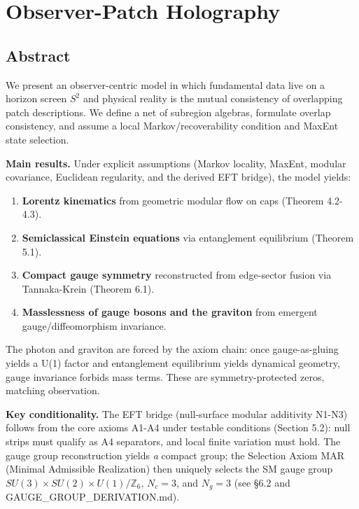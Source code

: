 \documentclass[
]{article}
\author{}
\date{}
\providecommand{\tightlist}{%
  \setlength{\itemsep}{0pt}\setlength{\parskip}{0pt}}
\begin{document}
\section{Observer-Patch Holography}\label{observer-patch-holography}

\subsection{Abstract}\label{abstract}

We present an observer-centric model in which fundamental data live on a
horizon screen \(S^2\) and physical reality is the mutual consistency of
overlapping patch descriptions. We define a net of subregion algebras,
formulate overlap consistency, and assume a local Markov/recoverability
condition and MaxEnt state selection.

\textbf{Main results.} Under explicit assumptions (Markov locality,
MaxEnt, modular covariance, Euclidean regularity, and the derived EFT
bridge), the model yields:

\begin{enumerate}
\def\labelenumi{\arabic{enumi}.}
\tightlist
\item
  \textbf{Lorentz kinematics} from geometric modular flow on caps
  (Theorem 4.2-4.3).
\item
  \textbf{Semiclassical Einstein equations} via entanglement equilibrium
  (Theorem 5.1).
\item
  \textbf{Compact gauge symmetry} reconstructed from edge-sector fusion
  via Tannaka-Krein (Theorem 6.1).
\item
  \textbf{Masslessness of gauge bosons and the graviton} from emergent
  gauge/diffeomorphism invariance.
\end{enumerate}

The photon and graviton are forced by the axiom chain: once
gauge-as-gluing yields a U(1) factor and entanglement equilibrium yields
dynamical geometry, gauge invariance forbids mass terms. These are
symmetry-protected zeros, matching observation.

\textbf{Key conditionality.} The EFT bridge (null-surface modular
additivity N1-N3) follows from the core axioms A1-A4 under testable
conditions (Section 5.2): null strips must qualify as A4 separators, and
local finite variation must hold. The gauge group reconstruction yields
\emph{a} compact group; the Selection Axiom MAR (Minimal Admissible
Realization) then uniquely selects the SM gauge group
\(SU(3) \times SU(2) \times U(1)/\mathbb{Z}_6\), \(N_c = 3\), and
\(N_g = 3\) (see §6.2 and GAUGE\_GROUP\_DERIVATION.md).
\end{document}

